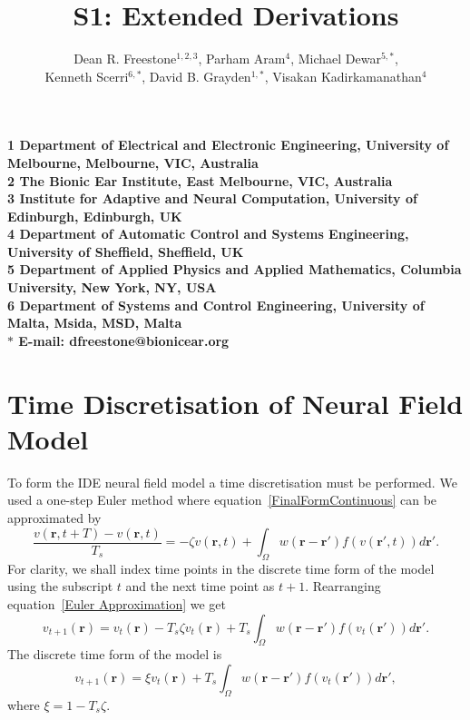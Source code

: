 \documentclass[]{article}
\title{S1: Extended Derivations}
\author{Dean R. Freestone$^{1,2,3}$, 
Parham Aram$^{4}$, 
Michael Dewar$^{5,\ast}$,\\
Kenneth Scerri$^{6,\ast}$,
David B. Grayden$^{1,\ast}$,
Visakan Kadirkamanathan$^{4}$}
\begin{document}
\ifpdf
{}
\else
{}
\fi

\maketitle

\begin{flushleft}

\bf{1} Department of Electrical and Electronic Engineering, University of Melbourne, Melbourne, VIC, Australia
\\
\bf{2} The Bionic Ear Institute, East Melbourne, VIC, Australia
\\
\bf{3} Institute for Adaptive and Neural Computation, University of Edinburgh, Edinburgh, UK
\\
\bf{4} Department of Automatic Control and Systems Engineering, University of Sheffield, Sheffield, UK
\\
\bf{5} Department of Applied Physics and Applied Mathematics, Columbia University, New York, NY, USA
\\
\bf{6} Department of Systems and Control Engineering, University of Malta, Msida, MSD, Malta
\\
$\ast$ E-mail: dfreestone@bionicear.org
\end{flushleft}

\section*{Time Discretisation of Neural Field Model}\label{Time Discretization} To form the IDE neural field model a 
time discretisation must be performed. We used a one-step Euler method where equation~\ref{FinalFormContinuous} can be approximated by 
\begin{equation}
	\label{Euler Approximation}\tag{S1.1} \frac{v\left( \mathbf{r},t+T \right) - v\left( \mathbf{r},t\right)}{T_s} =-\zeta v\left( \mathbf{r},t \right) + \int_\Omega {w\left( \mathbf{r}-\mathbf{r}' \right)f\left( {v\left( \mathbf{r}',t \right)} \right)d\mathbf{r}'}. 
\end{equation}
For clarity, we shall index time points in the discrete time form of the model using the subscript $t$ and the next time point as $t+1$. Rearranging equation~\ref{Euler Approximation} we get 
\begin{equation}
	\label{Euler Approximation2}\tag{S1.2} v_{t+1}\left( \mathbf{r}\right) = v_t\left( \mathbf{r}\right) -T_s \zeta v_t\left( \mathbf{r}\right) + T_s \int_\Omega {w\left( \mathbf{r}-\mathbf{r}' \right)f\left( {v_t\left( \mathbf{r}'\right)} \right)d\mathbf{r}'}. 
\end{equation}
The discrete time form of the model is 
\begin{equation}
	\label{Discrete Time Model1}\tag{S1} v_{t+1}\left(\mathbf{r}\right) = \xi v_t\left(\mathbf{r}\right) + T_s \int_\Omega { w\left(\mathbf{r}-\mathbf{r}'\right) f\left(v_t\left(\mathbf{r}'\right)\right) d\mathbf{r}'}, 
\end{equation}
where $\xi = 1 - T_s \zeta$.
\end{document}
